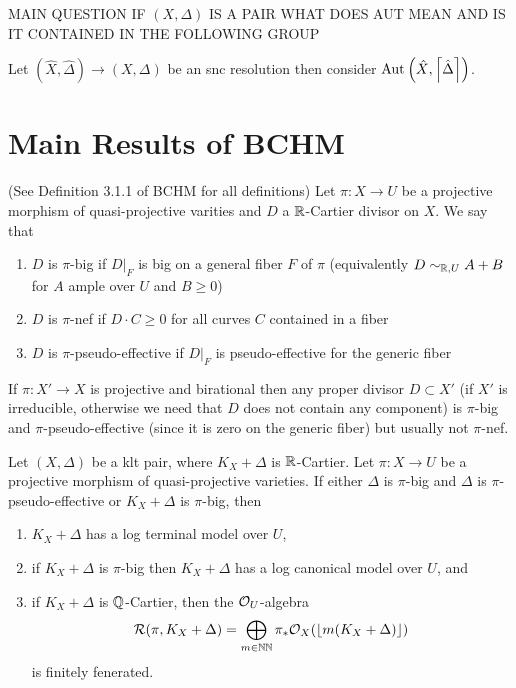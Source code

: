 \documentclass[12pt]{article}
\begin{document}
MAIN QUESTION IF $(X, \Delta)$ IS A PAIR WHAT DOES AUT MEAN AND IS IT CONTAINED IN THE FOLLOWING GROUP

Let $(\hat{X}, \hat{\Delta}) \to (X, \Delta)$ be an snc resolution then consider $\mathrm{Aut}_{} \left( \hat{X}, \left\lceil \hat{\Delta} \right\rceil \right)$. 


\section{Main Results of BCHM}

\begin{defn} (See Definition 3.1.1 of BCHM for all definitions)
Let $\pi : X \to U$ be a projective morphism of quasi-projective varities and $D$ a $\mathbb{R}$-Cartier divisor on $X$. We say that
\begin{enumerate}
\item $D$ is $\pi$-big if $D|_F$ is big on a general fiber $F$ of $\pi$ (equivalently $D \sim_{\mathbb{R}, U} A + B$ for $A$ ample over $U$ and $B \ge 0$) 
\item $D$ is $\pi$-nef if $D \cdot C \ge 0$ for all curves $C$ contained in a fiber
\item $D$ is $\pi$-pseudo-effective if $D|_F$ is pseudo-effective for the generic fiber 
\end{enumerate}
\end{defn}

\begin{rmk}
If $\pi : X' \to X$ is projective and birational then any proper divisor $D \subset X'$ (if $X'$ is irreducible, otherwise we need that $D$ does not contain any component) is $\pi$-big and $\pi$-pseudo-effective (since it is zero on the generic fiber) but usually not $\pi$-nef.
\end{rmk}

\begin{theorem}
Let $(X, \Delta)$ be a klt pair, where $K_X + \Delta$ is $\mathbb{R}$-Cartier. Let $\pi : X \to U$ be a projective morphism of quasi-projective varieties. If either $\Delta$ is $\pi$-big and $\Delta$ is $\pi$-pseudo-effective or $K_X + \Delta$ is $\pi$-big, then
\begin{enumerate}
\item $K_X + \Delta$ has a log terminal model over $U$,
\item if $K_X + \Delta$ is $\pi$-big then $K_X + \Delta$ has a log canonical model over $U$, and 
\item if $K_X + \Delta$ is $\mathbb{Q}$-Cartier, then the $\mathcal{O}_{U}$-algebra
\[ \mathcal{R}(\pi, K_X + \Delta) = \bigoplus_{m \in \mathbb{NN}} \pi_* \mathcal{O}_{X}( \left\lfloor m(K_X + \Delta) \right\rfloor) \]
is finitely fenerated.
\end{enumerate}
\end{theorem}
\end{document}
